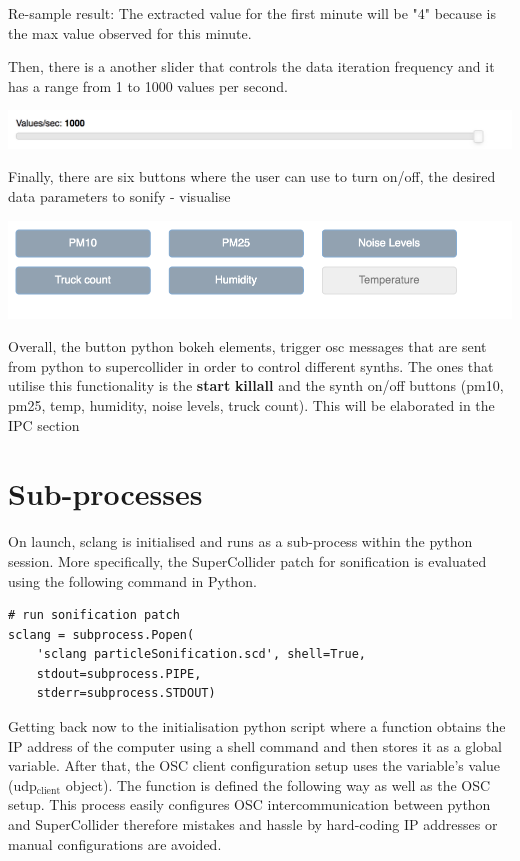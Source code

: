 \documentclass[11pt]{article}
\begin{document}
Re-sample result: The extracted value for the first minute will be "4" because is the max value observed for this minute.

Then, there is a another slider that controls the data iteration frequency and it has a range from 1 to 1000 values per second.

\begin{center}
\includegraphics[width=.9\linewidth]{./values_sec.png}
\end{center}

Finally, there are six buttons where the user can use to turn on/off, the desired data parameters to sonify - visualise

\begin{center}
\includegraphics[width=.9\linewidth]{./synth_onoff.png}
\end{center}

\vspace{0.5em}

Overall, the button python bokeh elements, trigger osc messages that are sent from python to supercollider in order to control different synths.
The ones that utilise this functionality is the \textbf{start} \textbf{killall} and the synth on/off buttons (pm10, pm25, temp, humidity, noise levels, truck count).
This will be elaborated in the IPC section

\section{Sub-processes}
\label{sec:org4c5f01e}
On launch, sclang is initialised and runs as a sub-process within the python session.  More specifically, the SuperCollider  patch for sonification is evaluated using the following command in Python.
\begin{verbatim}
# run sonification patch
sclang = subprocess.Popen(
    'sclang particleSonification.scd', shell=True,
    stdout=subprocess.PIPE,
    stderr=subprocess.STDOUT)
\end{verbatim}
Getting back now to the initialisation python script where a function obtains the IP address of the computer using a shell command and then stores it as a global variable.  After that, the OSC client configuration setup uses the variable's value (udp\(_{\text{client}}\) object).  The function is defined the following way as well as the OSC setup.  This process easily configures OSC intercommunication between python and SuperCollider therefore mistakes and hassle by hard-coding IP addresses or manual configurations are avoided.
\end{document}
